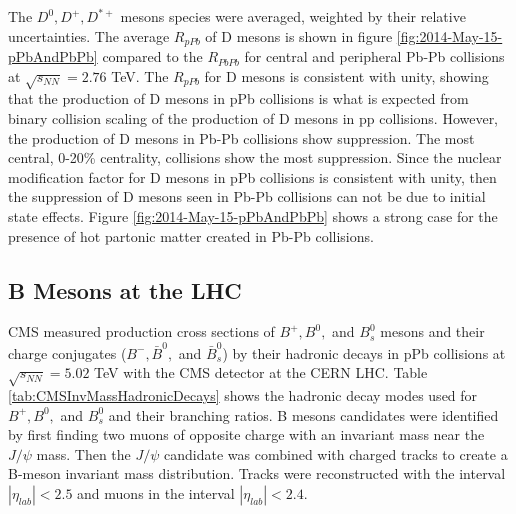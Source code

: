 The $D^{0}, D^{+}, D^{\ast +}$ mesons species were averaged, weighted by their relative uncertainties. The average $R_{pPb}$ of D mesons is shown in figure \ref{fig:2014-May-15-pPbAndPbPb} \cite{Abelev:2014hha} compared to the $R_{PbPb}$ for central and peripheral Pb-Pb collisions at $\sqrt{s_{NN}}=2.76$ TeV. The $R_{pPb}$ for D mesons is consistent with unity, showing that the production of D mesons in pPb collisions is what is expected from binary collision scaling of the production of D mesons in pp collisions. However, the production of D mesons in Pb-Pb collisions show suppression. The most central, 0-20\% centrality, collisions show the most suppression. Since the nuclear modification factor for D mesons in pPb collisions is consistent with unity, then the suppression of D mesons seen in Pb-Pb collisions can not be due to initial state effects. Figure \ref{fig:2014-May-15-pPbAndPbPb} shows a strong case for the presence of hot partonic matter created in Pb-Pb collisions.




\subsection{B Mesons at the LHC}



CMS measured production cross sections of $B^{+}, B^{0},$ and  $B^{0}_{s}$ mesons and their charge conjugates ($B^{-}, \bar B^{0},$ and  $\bar B^{0}_{s}$) by their hadronic decays in pPb collisions at $\sqrt{s_{NN}} = 5.02$ TeV with the CMS detector at the CERN LHC. Table \ref{tab:CMSInvMassHadronicDecays} shows the hadronic decay modes used for $B^{+}, B^{0},$ and  $B^{0}_{s}$ and their branching ratios. B mesons candidates were identified by first finding two muons of opposite charge with an invariant mass near the $J/\psi$ mass. Then the $J/\psi$ candidate was combined with charged tracks to create a B-meson invariant mass distribution. Tracks were reconstructed with the interval $|\eta_{lab}| < 2.5$ and muons in the interval $|\eta_{lab}| < 2.4$. 

